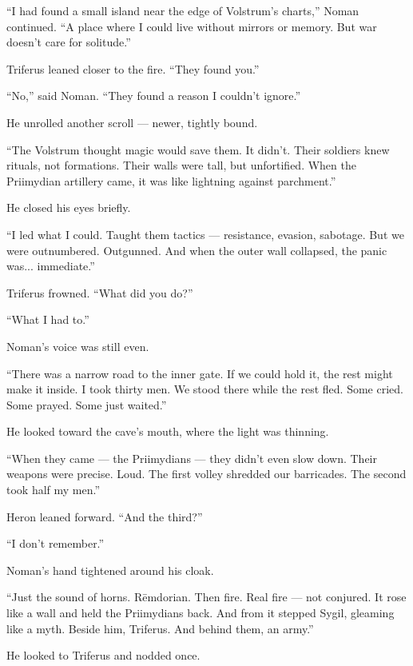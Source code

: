 \documentclass[9pt]{article}
\begin{document}
“I had found a small island near the edge of Volstrum’s charts,” Noman continued. “A place where I could live without mirrors or memory. But war doesn’t care for solitude.”

Triferus leaned closer to the fire. “They found you.”

“No,” said Noman. “They found a reason I couldn’t ignore.”

\vspace{1em}

He unrolled another scroll — newer, tightly bound.

“The Volstrum thought magic would save them. It didn’t. Their soldiers knew rituals, not formations. Their walls were tall, but unfortified. When the Priimydian artillery came, it was like lightning against parchment.”

He closed his eyes briefly.

“I led what I could. Taught them tactics — resistance, evasion, sabotage. But we were outnumbered. Outgunned. And when the outer wall collapsed, the panic was... immediate.”

\vspace{1em}

Triferus frowned. “What did you do?”

“What I had to.”

Noman’s voice was still even.

“There was a narrow road to the inner gate. If we could hold it, the rest might make it inside. I took thirty men. We stood there while the rest fled. Some cried. Some prayed. Some just waited.”

He looked toward the cave’s mouth, where the light was thinning.

“When they came — the Priimydians — they didn’t even slow down. Their weapons were precise. Loud. The first volley shredded our barricades. The second took half my men.”

\vspace{1em}

Heron leaned forward. “And the third?”

“I don’t remember.”

Noman’s hand tightened around his cloak.

“Just the sound of horns. Rēmdorian. Then fire. Real fire — not conjured. It rose like a wall and held the Priimydians back. And from it stepped Sygil, gleaming like a myth. Beside him, Triferus. And behind them, an army.”

He looked to Triferus and nodded once.
\end{document}
